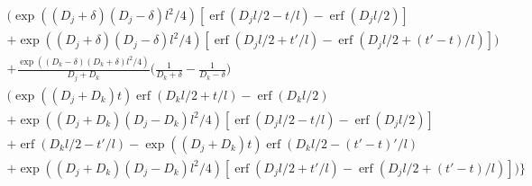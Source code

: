\documentclass[a4paper]{article}
\newcommand{\erf}{\operatorname{erf}}
\begin{document}
\begin{multline}
  \bigg(
  \exp((D_j + \delta)(D_j - \delta)l^2/4)[\erf(D_j l/2 - t/l) -
  \erf(D_j l/2)] \\
  + \exp((D_j + \delta)(D_j - \delta)l^2/4)[\erf(D_j l/2 + t'/l) -
  \erf(D_j l/2 + (t'-t)/l)]
  \bigg) \\
  +
  \frac{\exp((D_k-\delta)(D_k+\delta)l^2/4)}{D_j + D_k}
  \bigg(\frac{1}{D_k+\delta} - \frac{1}{D_k-\delta} \bigg) \\
  \bigg(
  \exp((D_j + D_k) t) \erf(D_k l/2 + t/l) - \erf(D_k l / 2) \\
  + \exp((D_j + D_k)(D_j - D_k)l^2/4)[\erf(D_j l/2 - t/l) -
  \erf(D_j l/2)] \\
  + \erf(D_k l / 2 - t'/l) - 
  \exp((D_j + D_k) t) \erf(D_k l / 2 - (t'-t)'/l) \\
  + \exp((D_j + D_k)(D_j - D_k)l^2/4)[\erf(D_j l/2 + t'/l) -
  \erf(D_j l/2 + (t'-t)/l)]
  \bigg)
  \bigg\} \\
\end{multline}
\end{document}
